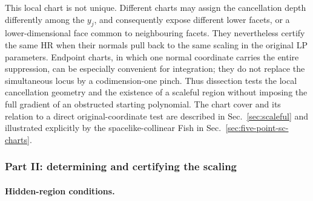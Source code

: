 \documentclass[a4paper,11pt]{article}
\begin{document}
This local chart is not unique.  Different charts may assign the cancellation
depth differently among the \(y_j\), and consequently expose different lower
facets, or a lower-dimensional face common to neighbouring facets.  They
nevertheless certify the same HR when their normals pull back to the same
scaling in the original LP parameters.  Endpoint charts, in which one normal
coordinate carries the entire suppression, can be especially convenient for
integration; they do not replace the simultaneous locus by a codimension-one
pinch.  Thus dissection tests the local cancellation geometry and the
existence of a scaleful region without imposing the full gradient of an
obstructed starting polynomial.  The chart cover and its relation to a direct
original-coordinate test are described in Sec.~\ref{sec:scaleful} and
illustrated explicitly by the spacelike-collinear Fish in
Sec.~\ref{sec:five-point-sc-charts}.

\subsubsection{Part II: determining and certifying the scaling}
\label{sec:layers}

\paragraph{Hidden-region conditions.}
\label{sec:definition}
\end{document}
